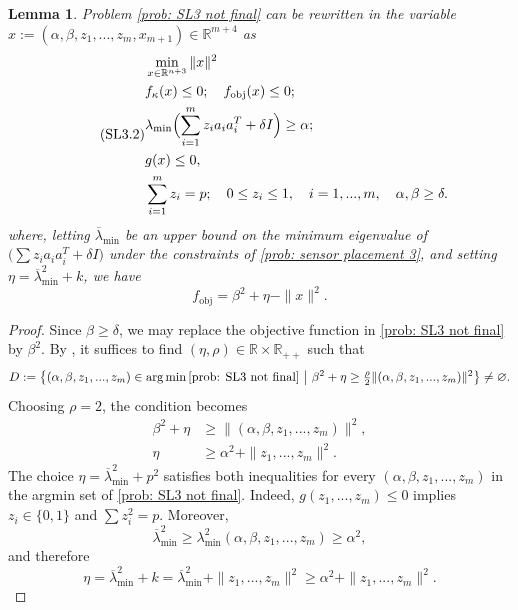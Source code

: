 \documentclass[12pt]{amsart}
\theoremstyle{plain}
\newtheorem{lemma}[theorem]{Lemma}
\theoremstyle{definition}
\begin{document}
\begin{lemma}
Problem \eqref{prob: SL3 not final} can be rewritten in the variable $x := (\alpha, \beta, z_1,...,z_m, x_{m+1}) \in \mathbb{R}^{m+4}$ as
\begin{equation}
\label{prob: SL3 final}
\tag{SL3.2}
\begin{split}
& \min_{x \in \mathbb{R}^{n+3}} \|x\|^2 \\
& f_\kappa(x)\le 0;\quad f_{\mathrm{obj}}(x)\le 0; \\
& \lambda_{\min}\Bigl( \sum_{i=1}^m z_i a_i a_i^T + \delta I \Bigr) \ge \alpha; \\
& g(x)\le 0, \\
& \sum_{i=1}^m z_i = p;\quad 0\le z_i \le 1,\quad i=1,...,m, \quad \alpha,\beta \ge \delta.
\end{split}
\end{equation}
where, letting $\overline{\lambda}_{\min}$ be an upper bound on the minimum eigenvalue of $\bigl(\sum z_i a_i a_i^T + \delta I\bigr)$ under the constraints of \eqref{prob: sensor placement 3}, and setting $\eta = \overline{\lambda}_{\min}^2 + k$, we have
\[
f_{\mathrm{obj}} = \beta^2 + \eta - \|x\|^2.
\]
\end{lemma}

\begin{proof}
Since $\beta \ge \delta$, we may replace the objective function in \eqref{prob: SL3 not final} by $\beta^2$. By \cite[Theorem 1]{bednarczuk2026outer}, it suffices to find $(\eta, \rho) \in \mathbb{R} \times \mathbb{R}_{++}$ such that
\[
D := \bigl\{ (\alpha,\beta,z_1,...,z_m) \in \arg\min \eqref{prob: SL3 not final} \ \big|\ 
\beta^2 + \eta \ge \tfrac{\rho}{2} \|(\alpha,\beta,z_1,...,z_m)\|^2 \bigr\} \neq \varnothing.
\]
Choosing $\rho = 2$, the condition becomes
\begin{align}
\beta^2 + \eta &\ge \|(\alpha,\beta,z_1,...,z_m)\|^2, \\
\eta &\ge \alpha^2 + \|z_1,...,z_m\|^2.
\end{align}
The choice $\eta = \overline{\lambda}_{\min}^2 + p^2$ satisfies both inequalities for every $(\alpha,\beta,z_1,...,z_m)$ in the argmin set of \eqref{prob: SL3 not final}. Indeed, $g(z_1,...,z_m) \le 0$ implies $z_i \in \{0,1\}$ and $\sum z_i^2 = p$. Moreover,
\[
\overline{\lambda}_{\min}^2 \ge \lambda_{\min}^2(\alpha,\beta,z_1,...,z_m) \ge \alpha^2,
\]
and therefore
\[
\eta = \overline{\lambda}_{\min}^2 + k = \overline{\lambda}_{\min}^2 + \|z_1,...,z_m\|^2 \ge \alpha^2 + \|z_1,...,z_m\|^2.
\]
\end{proof}
\end{document}
